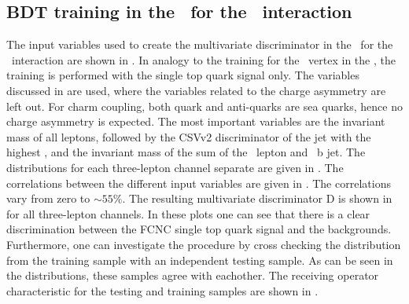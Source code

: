 \clearpage	
\subsection{BDT training in the \STSR\ for the \Zct\ interaction}
\label{sec:BDTSTSRZCT}
The input variables used to create the multivariate discriminator in the \STSR\ for the \Zct\ interaction are shown in . In analogy to the training for the \Zut\ vertex in the \STSR, the training is performed with the single top quark signal only. The variables discussed in  are used, where the variables related to the charge asymmetry are left out. For charm coupling, both quark and anti-quarks are sea quarks, hence no charge asymmetry is expected. The most important variables are the invariant mass of all leptons,  followed by the CSVv2 discriminator of the jet with the highest \pt, and the invariant mass of the sum of the \PW\ lepton and \SM\ b jet. The distributions for each three-lepton channel separate are given in .
The correlations between the different input variables are given in . The correlations vary from zero to $\sim 55\%$.
The resulting multivariate discriminator D is shown in  for all three-lepton channels. In these plots one can see that there is a clear discrimination between the FCNC single top quark signal and the backgrounds. Furthermore, one can investigate the procedure by cross checking the distribution from the training sample with an independent testing sample. As can be seen in the distributions, these samples agree with eachother. The receiving operator characteristic for the testing and training samples are shown in . 

